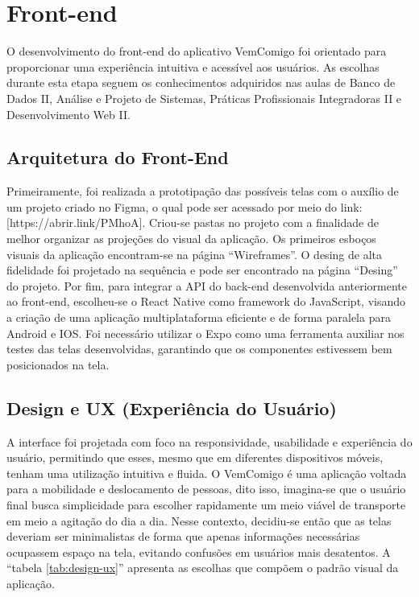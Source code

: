 \section{Front-end}

O desenvolvimento do front-end do aplicativo VemComigo foi orientado para proporcionar uma experiência intuitiva e acessível aos usuários. As escolhas durante esta etapa seguem os conhecimentos adquiridos nas aulas de Banco de Dados II, Análise e Projeto de Sistemas, Práticas Profissionais Integradoras II e Desenvolvimento Web II.

\subsection{Arquitetura do Front-End}

Primeiramente, foi realizada a prototipação das possíveis telas com o auxílio de um projeto criado no Figma, o qual pode ser acessado por meio do link:[https://abrir.link/PMhoA]. Criou-se pastas no projeto com a finalidade de melhor organizar as projeções do visual da aplicação. Os primeiros esboços visuais da aplicação encontram-se na página ``Wireframes''. O desing de alta fidelidade foi projetado na sequência e pode ser encontrado na página ``Desing'' do projeto. Por fim, para integrar a API do back-end desenvolvida anteriormente ao front-end, escolheu-se o React Native como framework do JavaScript, visando a criação de uma aplicação multiplataforma eficiente e de forma paralela para Android e IOS. Foi necessário utilizar o Expo como uma ferramenta auxiliar nos testes das telas desenvolvidas, garantindo que os componentes estivessem bem posicionados na tela.

\subsection{Design e UX (Experiência do Usuário)}

A interface foi projetada com foco na responsividade, usabilidade e experiência do usuário, permitindo que esses, mesmo que em diferentes dispositivos móveis, tenham uma utilização intuitiva e fluida. O VemComigo é uma aplicação voltada para a mobilidade e deslocamento de pessoas, dito isso, imagina-se que o usuário final busca simplicidade para escolher rapidamente um meio viável de transporte em meio a agitação do dia a dia. Nesse contexto, decidiu-se então que as telas deveriam ser minimalistas de forma que apenas informações necessárias ocupassem espaço na tela, evitando confusões em usuários mais desatentos. A ``tabela \ref{tab:design-ux}'' apresenta as escolhas que compõem o padrão visual da aplicação.

